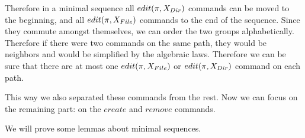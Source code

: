 Therefore in a minimal sequence all \(edit(\pi,X_{Dir})\) commands can be
moved to the beginning, and all \(edit(\pi,X_{File})\) commands to the
end of the sequence. Since they commute amongst themselves, we can order
the two groups alphabetically. Therefore if there were two commands on
the same path, they would be neighbors and would be simplified by the
algebraic laws. 
Therefore we can be sure that there are at most one
\(edit(\pi,X_{File})\) or \(edit(\pi,X_{Dir})\) command on each path.

This way we also separated these commands from the rest.
Now we can focus on the remaining part: on the \(create\) and 
\(remove\) commands.

\label{theorem:crrm}

We will prove some lemmas about minimal sequences.
